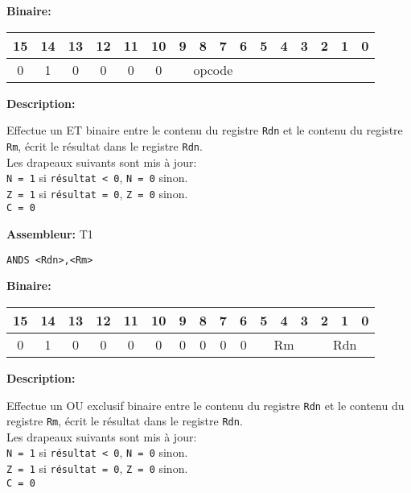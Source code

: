 \documentclass{article}
\begin{document}
    \textbf{Binaire:}

    \begin{tabular}{| c c c c c c c c c c c c c c c c |}
        \hline
        15 & 14 & 13 & 12 & 11 & 10 & \multicolumn{1}{|c}{9} & 8 & 7 & 6 & \multicolumn{1}{|c}{5} & 4 & 3 & 2 & 1 & 0 \\
        \hline
        0 & 1 & 0 & 0 & 0 & 0 & \multicolumn{4}{|c}{opcode} & \multicolumn{6}{|c|}{} \\
        \hline
    \end{tabular}


    \textbf{Description: }

    Effectue un ET binaire entre le contenu du registre \texttt{Rdn} et le contenu du registre \texttt{Rm}, écrit le résultat dans le registre \texttt{Rdn}.\\
    Les drapeaux suivants sont mis à jour:\\
    \texttt{N = 1} si \texttt{résultat < 0}, \texttt{N = 0} sinon.\\
    \texttt{Z = 1} si \texttt{résultat = 0}, \texttt{Z = 0} sinon.\\
    \texttt{C = 0}

    \textbf{Assembleur:} T1

    \begin{lstlisting}
ANDS <Rdn>,<Rm>
    \end{lstlisting}

    \textbf{Binaire:}

    \begin{tabular}{| c c c c c c c c c c c c c c c c |}
        \hline
        15 & 14 & 13 & 12 & 11 & 10 & \multicolumn{1}{|c}{9} & 8 & 7 & 6 & \multicolumn{1}{|c}{5} & 4 & 3 & \multicolumn{1}{|c}{2} & 1 & 0 \\
        \hline
        0 & 1 & 0 & 0 & 0 & 0 & \multicolumn{1}{|c}{0} & 0 & 0 & 0 & \multicolumn{3}{|c}{Rm} & \multicolumn{3}{|c|}{Rdn} \\
        \hline
    \end{tabular}



    \textbf{Description: }

    Effectue un OU exclusif binaire entre le contenu du registre \texttt{Rdn} et le contenu du registre \texttt{Rm}, écrit le résultat dans le registre \texttt{Rdn}.\\
    Les drapeaux suivants sont mis à jour:\\
    \texttt{N = 1} si \texttt{résultat < 0}, \texttt{N = 0} sinon.\\
    \texttt{Z = 1} si \texttt{résultat = 0}, \texttt{Z = 0} sinon.\\
    \texttt{C = 0}
\end{document}
